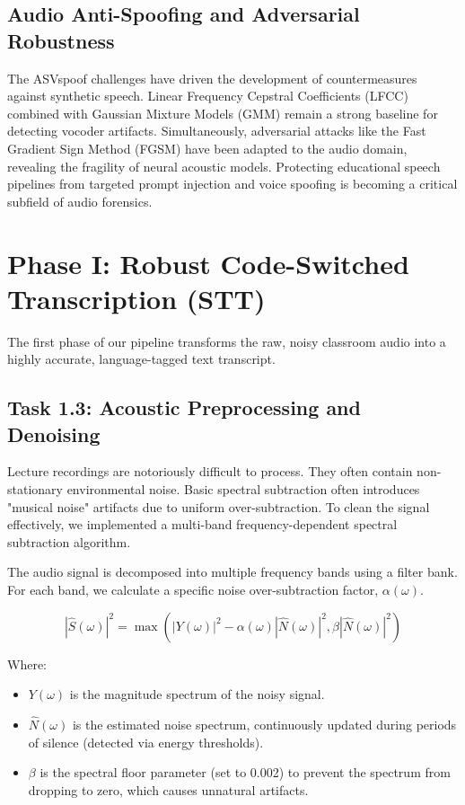 \documentclass[conference]{IEEEtran}
\begin{document}
\subsection{Audio Anti-Spoofing and Adversarial Robustness}
The ASVspoof challenges \cite{todisco2019asvspoof} have driven the development of countermeasures against synthetic speech. Linear Frequency Cepstral Coefficients (LFCC) combined with Gaussian Mixture Models (GMM) remain a strong baseline for detecting vocoder artifacts. Simultaneously, adversarial attacks like the Fast Gradient Sign Method (FGSM) \cite{goodfellow2014explaining} have been adapted to the audio domain, revealing the fragility of neural acoustic models. Protecting educational speech pipelines from targeted prompt injection and voice spoofing is becoming a critical subfield of audio forensics.

\section{Phase I: Robust Code-Switched Transcription (STT)}

The first phase of our pipeline transforms the raw, noisy classroom audio into a highly accurate, language-tagged text transcript.

\subsection{Task 1.3: Acoustic Preprocessing and Denoising}

Lecture recordings are notoriously difficult to process. They often contain non-stationary environmental noise. Basic spectral subtraction often introduces "musical noise" artifacts due to uniform over-subtraction. To clean the signal effectively, we implemented a multi-band frequency-dependent spectral subtraction algorithm.

The audio signal is decomposed into multiple frequency bands using a filter bank. For each band, we calculate a specific noise over-subtraction factor, $\alpha(\omega)$.

\begin{equation}
|\hat{S}(\omega)|^2 = \max\left(|Y(\omega)|^2 - \alpha(\omega)|\hat{N}(\omega)|^2, \beta|\hat{N}(\omega)|^2\right)
\end{equation}

Where:
\begin{itemize}
    \item $Y(\omega)$ is the magnitude spectrum of the noisy signal.
    \item $\hat{N}(\omega)$ is the estimated noise spectrum, continuously updated during periods of silence (detected via energy thresholds).
    \item $\beta$ is the spectral floor parameter (set to 0.002) to prevent the spectrum from dropping to zero, which causes unnatural artifacts.
\end{itemize}
\end{document}
